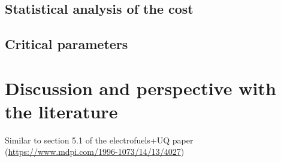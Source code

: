 \subsection{Statistical analysis of the cost}
\label{subsec:chap_2_stat_analysis}

\subsection{Critical parameters}
\label{subsec:chap_2_crit_param}

\section{Discussion and perspective with the literature}
Similar to section 5.1 of the electrofuels+UQ paper (\url{https://www.mdpi.com/1996-1073/14/13/4027})
